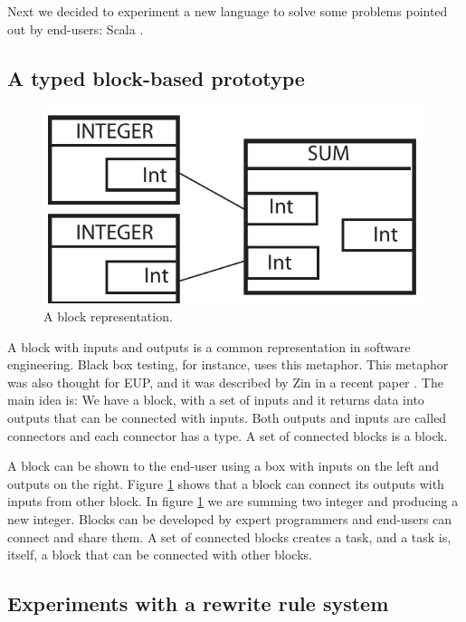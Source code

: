 \documentclass[9pt,a4paper]{extarticle}
\begin{document}
\begin{multicols}{2}
Next we decided to experiment a new language to solve some problems pointed out by end-users: Scala \cite{ProgrammingScala}.

\subsection{A typed block-based prototype}

\begin{figure}[H]
\centerline{\includegraphics[scale=.6]{block_example.pdf}}
\label{fig:block}
\caption{A block representation.} 
\end{figure}

A block with inputs and outputs is a common representation in software engineering. 
Black box testing, for instance, uses this metaphor. 
This metaphor was also thought for EUP, and it was described by Zin in a recent paper \cite{Zin2011}. 
The main idea is: We have a block, with a set of inputs and it returns data into outputs that can be connected with inputs.
Both outputs and inputs are called connectors and each connector has a type. A set of connected blocks is a block. 

A block  can be shown to the end-user using a box with inputs on the left and outputs on the right. Figure \ref{fig:block} shows that a block can connect its outputs with inputs from other block. In figure \ref{fig:block} we are summing two integer and producing a new integer.
Blocks can be developed by expert programmers and end-users can connect and share them. 
A set of connected blocks creates a task, and a task is, itself, a block that can be connected with other blocks.

\subsection{Experiments with a rewrite rule system}


\end{multicols}
\end{document}
